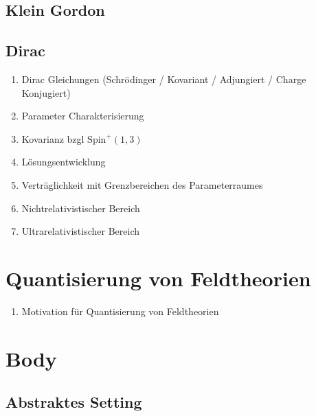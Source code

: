 \documentclass[10pt, letterpaper]{article}
\newcommand{\Spin}{\mathrm{Spin}}
\begin{document}
\subsection{Klein Gordon}



\subsection{Dirac}

\begin{enumerate}
  \item Dirac Gleichungen (Schrödinger / Kovariant / Adjungiert / Charge Konjugiert)
  \item Parameter Charakterisierung
  \item Kovarianz bzgl $\Spin^+(1,3)$
  \item Lösungsentwicklung
  \item Verträglichkeit mit Grenzbereichen des Parameterraumes
  \item Nichtrelativistischer Bereich
  \item Ultrarelativistischer Bereich
\end{enumerate}



\section{Quantisierung von Feldtheorien}

\begin{enumerate}
  \item Motivation für Quantisierung von Feldtheorien
\end{enumerate}


\pagebreak

\section{Body}


\subsection{Abstraktes Setting}
\end{document}
